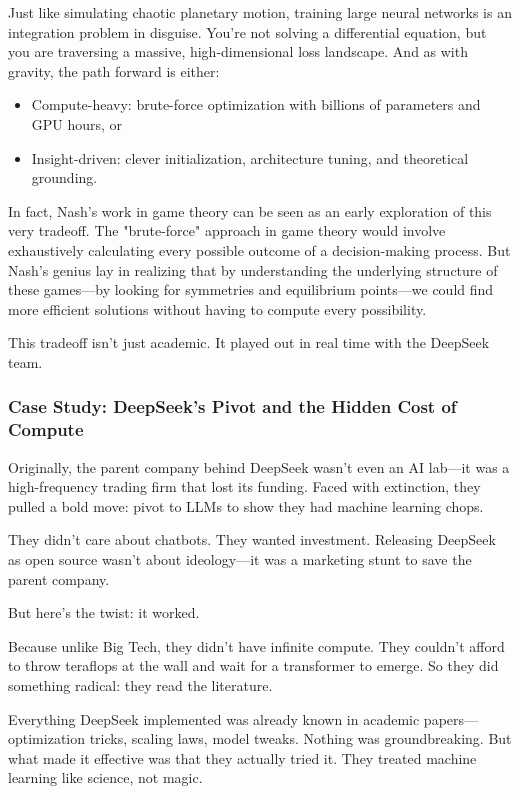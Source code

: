 Just like simulating chaotic planetary motion, training large neural networks is an integration problem in disguise. You’re not solving a differential equation, but you are traversing a massive, high-dimensional loss landscape. And as with gravity, the path forward is either:

\begin{itemize} 
	\item Compute-heavy: brute-force optimization with billions of parameters and GPU hours, or 
	\item Insight-driven: clever initialization, architecture tuning, and theoretical grounding. 
\end{itemize}

In fact, Nash’s work in game theory can be seen as an early exploration of this very tradeoff. The "brute-force" approach in game theory would involve exhaustively calculating every possible outcome of a decision-making process. But Nash’s genius lay in realizing that by understanding the underlying structure of these games—by looking for symmetries and equilibrium points—we could find more efficient solutions without having to compute every possibility.

This tradeoff isn’t just academic. It played out in real time with the DeepSeek team.

\subsubsection{Case Study: DeepSeek’s Pivot and the Hidden Cost of Compute}

Originally, the parent company behind DeepSeek wasn’t even an AI lab—it was a high-frequency trading firm that lost its funding. Faced with extinction, they pulled a bold move: pivot to LLMs to show they had machine learning chops.

They didn’t care about chatbots. They wanted investment. Releasing DeepSeek as open source wasn’t about ideology—it was a marketing stunt to save the parent company.

But here’s the twist: it worked.

Because unlike Big Tech, they didn’t have infinite compute. They couldn’t afford to throw teraflops at the wall and wait for a transformer to emerge. So they did something radical: they read the literature.

Everything DeepSeek implemented was already known in academic papers—optimization tricks, scaling laws, model tweaks. Nothing was groundbreaking. But what made it effective was that they actually tried it. They treated machine learning like science, not magic.

